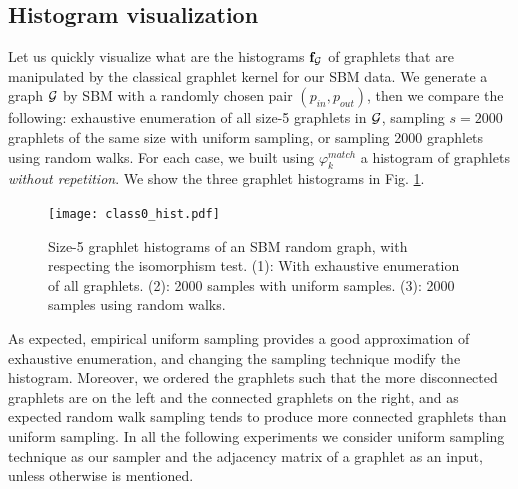 \subsection{Histogram visualization}
Let us quickly visualize what are the histograms $\mathbf{f}_{\mathcal{G}}$ of graphlets that are manipulated by the classical graphlet kernel for our SBM data. We generate a graph $\mathcal{G}$ by SBM with a randomly chosen pair $(p_{in},p_{out})$, then we compare the following: exhaustive enumeration of all size-5 graphlets in $\mathcal{G}$, sampling $s=2000$ graphlets of the same size with uniform sampling, or sampling 2000 graphlets using random walks. For each case, we built using $\varphi^{match}_k$ a histogram of graphlets \emph{without repetition}. We show the three graphlet histograms in Fig. \ref{fig:graphlet_hist}. 

\begin{figure}[H]
\centering
\texttt{[image: class0\_hist.pdf]}
\caption[Graphlet histograms of uniform and random walk sampling techniques]{Size-5 graphlet histograms of an SBM random graph, with respecting the isomorphism test. (1): With exhaustive enumeration of all graphlets. (2): 2000 samples with uniform samples. (3): 2000 samples using random walks. }
\label{fig:graphlet_hist}
\end{figure}

As expected, empirical uniform sampling provides a good approximation of exhaustive enumeration, and changing the sampling technique modify the histogram. Moreover, we ordered the graphlets such that the more disconnected graphlets are on the left and the connected graphlets on the right, and as expected random walk sampling tends to produce more connected graphlets than uniform sampling. In all the  following experiments we consider uniform sampling technique as our sampler and the adjacency matrix of a graphlet as an input, unless otherwise is mentioned.
